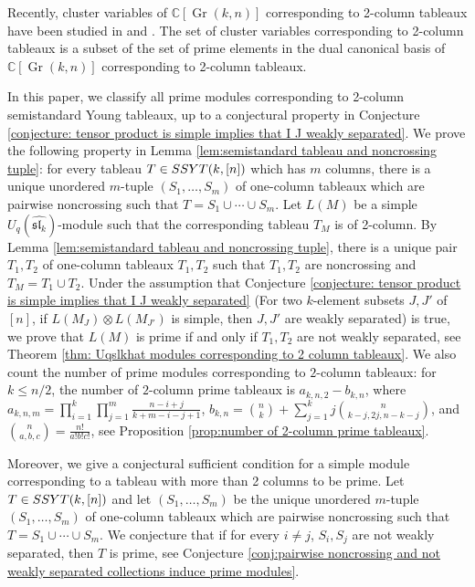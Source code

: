 \documentclass[12pt, reqno]{amsart}
\theoremstyle{plain}
\theoremstyle{definition}
\numberwithin{equation}{section}
\newcommand{\CC}{{\mathbb {C}}}
\DeclareMathOperator{\Gr}{Gr}
\begin{document}
Recently, cluster variables of $\CC[\Gr(k,n)]$ corresponding to 2-column tableaux have been studied in \cite[Section 4]{BBGL} and \cite{LeY23}. The set of cluster variables corresponding to 2-column tableaux is a subset of the set of 
prime elements in the dual canonical basis of $\CC[\Gr(k,n)]$ corresponding to 2-column tableaux.  

In this paper, we classify all prime modules corresponding to 2-column semistandard Young tableaux, up to a conjectural property in Conjecture \ref{conjecture: tensor product is simple implies that I J weakly separated}. We prove the following property in Lemma \ref{lem:semistandard tableau and noncrossing tuple}: for every tableau $T \in {\rm SSYT}(k, [n])$ which has $m$ columns, there is a unique unordered $m$-tuple $(S_1, \ldots, S_m)$ of one-column tableaux which are pairwise noncrossing such that $T = S_1 \cup \cdots \cup S_m$. Let $L(M)$ be a simple $U_q(\widehat{\mathfrak{sl}_k})$-module such that the corresponding tableau $T_M$ is of 2-column. By Lemma \ref{lem:semistandard tableau and noncrossing tuple}, there is a unique pair $T_1, T_2$ of one-column tableaux $T_1, T_2$ such that $T_1, T_2$ are noncrossing and $T_M = T_1 \cup T_2$. Under the assumption that Conjecture \ref{conjecture: tensor product is simple implies that I J weakly separated} (For two $k$-element subsets $J, J'$ of $[n]$, if $L(M_{J}) \otimes L(M_{J'})$ is simple, then $J, J'$ are weakly separated) is true, we prove that $L(M)$ is prime if and only if $T_1, T_2$ are not weakly separated, see Theorem \ref{thm: Uqslkhat modules corresponding to 2 column tableaux}. We also count the number of prime modules corresponding to $2$-column tableaux: for $k \le n/2$, the number of $2$-column prime tableaux is $a_{k,n,2}-b_{k,n}$, where $a_{k,n,m}=\prod_{i=1}^k \prod_{j=1}^m \frac{n-i+j}{k+m-i-j+1}$, $b_{k,n} = \binom{n}{k} + \sum_{j=1}^{k} j \genfrac{(}{)}{0pt}{}{n}{k-j, 2j, n-k-j}$, and $\genfrac{(}{)}{0pt}{}{n}{a,b,c}=\frac{n!}{a!b!c!}$, see Proposition \ref{prop:number of 2-column prime tableaux}.

Moreover, we give a conjectural sufficient condition for a simple module corresponding to a tableau with more than 2 columns to be prime. Let $T \in {\rm SSYT}(k, [n])$ and let $(S_1, \ldots, S_m)$ be the unique unordered $m$-tuple $(S_1, \ldots, S_m)$ of one-column tableaux which are pairwise noncrossing such that $T = S_1 \cup \cdots \cup S_m$. We conjecture that if for every $i \ne j$, $S_i, S_j$ are not weakly separated, then $T$ is prime, see Conjecture \ref{conj:pairwise noncrossing and not weakly separated collections induce prime modules}. 
\end{document}

